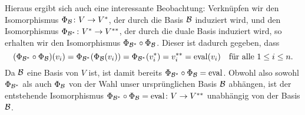 \documentclass[a4paper,10pt]{article}
\begin{document}
Hieraus ergibt sich auch eine interessante Beobachtung: Verknüpfen wir den Isomorphismus $\Phi_{\mathcal{B}} \colon V \to V^*$, der durch die Basis $\mathcal{B}$ induziert wird, und den Isomorphismus $\Phi_{\mathcal{B}^*} \colon V^* \to V^{**}$, der durch die duale Basis induziert wird, so erhalten wir den Isomorphismus $\Phi_{\mathcal{B}^*} \circ \Phi_{\mathcal{B}}$. Dieser ist dadurch gegeben, dass 
\[
 (\Phi_{\mathcal{B}^*} \circ \Phi_{\mathcal{B}})(v_i)
 = \Phi_{\mathcal{B}^*}(\Phi_{\mathcal{B}}(v_i))
 = \Phi_{\mathcal{B}^*}(v_i^*)
 = v_i^{**}
 = \mathrm{eval}(v_i)
 \quad
 \text{für alle $1 \leq i \leq n$}.
\]
Da $\mathcal{B}$ eine Basis von $V$ ist, ist damit bereits $\Phi_{\mathcal{B}^*} \circ \Phi_{\mathcal{B}} = \mathrm{eval}$. Obwohl also sowohl $\Phi_{\mathcal{B}^*}$ als auch $\Phi_{\mathcal{B}}$ von der Wahl unser ursprünglichen Basis $\mathcal{B}$ abhängen, ist der entstehende Isomorphismus $\Phi_{\mathcal{B}^*} \circ \Phi_{\mathcal{B}} = \mathrm{eval} \colon V \to V^{**}$ unabhängig von der Basis $\mathcal{B}$.
\end{document}

